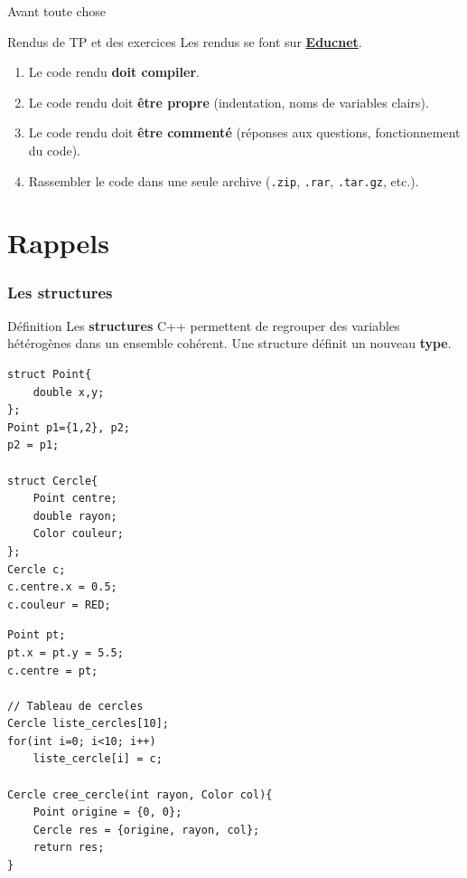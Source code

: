 
\subtitle{Fichiers séparés - Opérateurs}
\date[12 oct. 2017]{Vendredi 12 octobre 2018}
\maketitle

\begin{frame}{Avant toute chose}
  \begin{alertblock}{Rendus de TP et des exercices}
  Les rendus se font sur \href{https://educnet.enpc.fr}{\textbf{Educnet}}.
  \begin{enumerate}
    \item Le code rendu \textbf{doit compiler}.
    \item Le code rendu doit \textbf{être propre} (indentation, noms de variables clairs).
    \item Le code rendu doit \textbf{être commenté} (réponses aux questions, fonctionnement du code).
    \item Rassembler le code dans une seule archive (\texttt{.zip}, \texttt{.rar}, \texttt{.tar.gz}, etc.).
  \end{enumerate}
  \end{alertblock}
\end{frame}

\section{Rappels}

\begin{frame}[fragile=singleslide]
    \frametitle{Les structures}
    \begin{block}{Définition}
        Les \textbf{structures} C++ permettent de regrouper des variables hétérogènes dans un ensemble cohérent. Une structure définit un nouveau \textbf{type}.
    \end{block}

\begin{minipage}{0.40\linewidth}
        \begin{verbatim}
struct Point{
    double x,y;
};
Point p1={1,2}, p2;
p2 = p1;

struct Cercle{
    Point centre;
    double rayon;
    Color couleur;
};
Cercle c;
c.centre.x = 0.5;
c.couleur = RED;
        \end{verbatim}
\end{minipage}%
\begin{minipage}{0.60\linewidth}
        \begin{verbatim}
Point pt;
pt.x = pt.y = 5.5;
c.centre = pt;

// Tableau de cercles
Cercle liste_cercles[10];
for(int i=0; i<10; i++)
    liste_cercle[i] = c;

Cercle cree_cercle(int rayon, Color col){
    Point origine = {0, 0};
    Cercle res = {origine, rayon, col};
    return res;
}
        \end{verbatim}
\end{minipage}
\end{frame}

